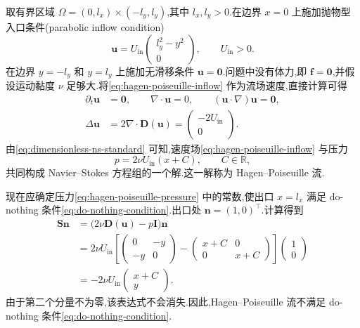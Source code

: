 \begin{example}\label{ex:hagen-poiseuille}
取有界区域 $\Omega=(0,l_x)\times(-l_y,l_y)$,其中 $l_x,l_y>0$.在边界 $x=0$ 上施加抛物型入口条件(parabolic inflow condition)
\begin{equation}\label{eq:hagen-poiseuille-inflow}
  \bm{u}=U_{\mathrm{in}}
    \begin{pmatrix}l_y^2-y^2\\0\end{pmatrix},
  \qquad U_{\mathrm{in}}>0.
\end{equation}
在边界 $y=-l_y$ 和 $y=l_y$ 上施加无滑移条件 $\bm{u}=\bm{0}$.问题中没有体力,即 $\bm{f}=\bm{0}$,并假设运动黏度 $\nu$ 足够大.将\cref{eq:hagen-poiseuille-inflow} 作为流场速度,直接计算可得
\begin{equation*}
\begin{aligned}
  \partial_t\bm{u}&=\bm{0},\qquad
  \nabla\cdot\bm{u}=0,\qquad
  (\bm{u}\cdot\nabla)\bm{u}=\bm{0},\\
  \Delta\bm{u}&=2\nabla\cdot\bm{D}(\bm{u})
      =\begin{pmatrix}-2U_{\mathrm{in}}\\0\end{pmatrix}.
\end{aligned}
\end{equation*}
由\cref{eq:dimensionless-ns-standard} 可知,速度场\cref{eq:hagen-poiseuille-inflow} 与压力
\begin{equation}\label{eq:hagen-poiseuille-pressure}
  p=2\nu U_{\mathrm{in}}(x+C),
  \qquad C\in\mathbb{R},
\end{equation}
共同构成 Navier--Stokes 方程组的一个解.这一解称为 Hagen--Poiseuille 流.

现在应确定压力\cref{eq:hagen-poiseuille-pressure} 中的常数,使出口 $x=l_x$ 满足 do-nothing 条件\cref{eq:do-nothing-condition}.出口处 $\bm{n}=(1,0)^{\top}$.计算得到
\begin{equation*}
\begin{aligned}
  \bm{S}\bm{n}
  &=\bigl(2\nu\bm{D}(\bm{u})-p\bm{I}\bigr)\bm{n}\\
  &=2\nu U_{\mathrm{in}}
    \left[
      \begin{pmatrix}0&-y\\-y&0\end{pmatrix}
      -\begin{pmatrix}x+C&0\\0&x+C\end{pmatrix}
    \right]
    \begin{pmatrix}1\\0\end{pmatrix}\\
  &=-2\nu U_{\mathrm{in}}\begin{pmatrix}x+C\\y\end{pmatrix}.
\end{aligned}
\end{equation*}
由于第二个分量不为零,该表达式不会消失.因此,Hagen--Poiseuille 流不满足 do-nothing 条件\cref{eq:do-nothing-condition}.


\end{example}
